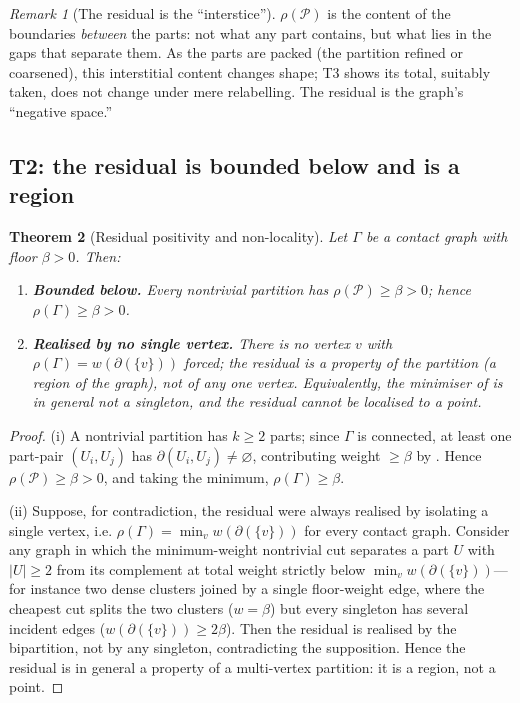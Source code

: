 \documentclass[11pt,a4paper]{article}
\theoremstyle{thmstyle}
\newtheorem{theorem}{Theorem}[section]
\theoremstyle{definition}
\theoremstyle{remark}
\newtheorem{remark}[theorem]{Remark}
\newcommand{\Gph}{\Gamma}                 %
\newcommand{\wt}{w}                       %
\newcommand{\floorc}{\beta}               %
\newcommand{\cut}{\partial}               %
\newcommand{\Res}{\rho}                   %
\newcommand{\abs}[1]{\lvert#1\rvert}
\begin{document}
\begin{remark}[The residual is the ``interstice'']
\label{rem:interstice}
$\Res(\mathcal{P})$ is the content of the boundaries \emph{between} the parts:
not what any part contains, but what lies in the gaps that separate them. As the
parts are packed (the partition refined or coarsened), this interstitial content
changes shape; T3 shows its total, suitably taken, does not change under mere
relabelling. The residual is the graph's ``negative space.''
\end{remark}

\subsection{T2: the residual is bounded below and is a region}

\begin{theorem}[Residual positivity and non-locality]
\label{thm:residual-region}
Let $\Gph$ be a contact graph with floor $\floorc>0$. Then:
\begin{enumerate}[label=\textup{(\roman*)},leftmargin=2.2em]
\item \textbf{Bounded below.} Every nontrivial partition has
$\Res(\mathcal{P})\ge\floorc>0$; hence $\Res(\Gph)\ge\floorc>0$.
\item \textbf{Realised by no single vertex.} There is no vertex $v$ with
$\Res(\Gph)=\wt(\cut(\{v\}))$ forced; the residual is a property of the
partition (a region of the graph), not of any one vertex. Equivalently, the
minimiser of  is in general not a singleton, and the residual
cannot be localised to a point.
\end{enumerate}
\end{theorem}

\begin{proof}
(i) A nontrivial partition has $k\ge2$ parts; since $\Gph$ is connected, at
least one part-pair $(U_i,U_j)$ has $\cut(U_i,U_j)\neq\varnothing$, contributing
weight $\ge\floorc$ by . Hence $\Res(\mathcal{P})\ge\floorc>0$,
and taking the minimum, $\Res(\Gph)\ge\floorc$.

(ii) Suppose, for contradiction, the residual were always realised by isolating a
single vertex, i.e. $\Res(\Gph)=\min_v\wt(\cut(\{v\}))$ for every contact graph.
Consider any graph in which the minimum-weight nontrivial cut separates a part
$U$ with $\abs{U}\ge 2$ from its complement at total weight strictly below
$\min_v\wt(\cut(\{v\}))$---for instance two dense clusters joined by a single
floor-weight edge, where the cheapest cut splits the two clusters
($\wt=\floorc$) but every singleton has several incident edges
($\wt(\cut(\{v\}))\ge 2\floorc$). Then the residual is realised by the
bipartition, not by any singleton, contradicting the supposition. Hence the
residual is in general a property of a multi-vertex partition: it is a region,
not a point.
\end{proof}
\end{document}
